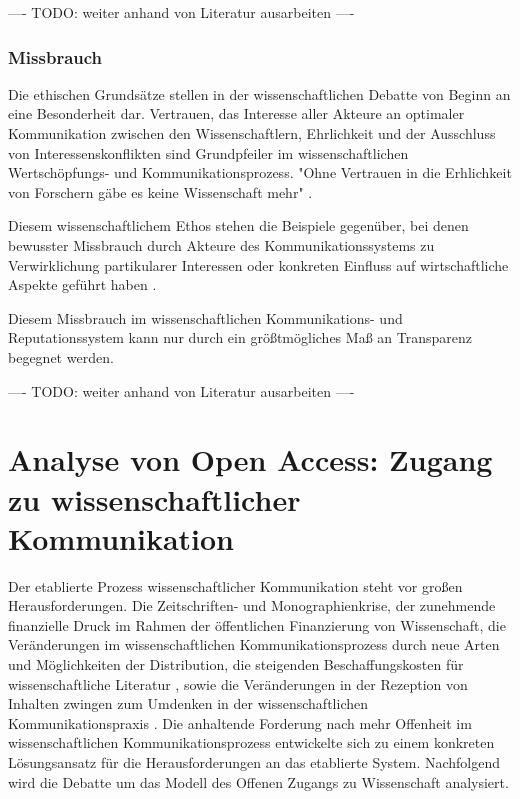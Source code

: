 ---- TODO: weiter anhand von Literatur ausarbeiten ----

\subsubsection{Missbrauch}

Die ethischen Grundsätze stellen in der wissenschaftlichen Debatte von Beginn an eine Besonderheit dar. Vertrauen, das Interesse aller Akteure an optimaler Kommunikation zwischen den Wissenschaftlern, Ehrlichkeit und der Ausschluss von Interessenskonflikten sind Grundpfeiler im wissenschaftlichen Wertschöpfungs- und Kommunikationsprozess. "Ohne Vertrauen in die Erhlichkeit von Forschern gäbe es keine Wissenschaft mehr" \cite{hagner_2015_sache_buches}.

Diesem wissenschaftlichem Ethos stehen die Beispiele gegenüber, bei denen bewusster Missbrauch durch Akteure des Kommunikationssystems zu Verwirklichung partikularer Interessen oder konkreten Einfluss auf wirtschaftliche Aspekte geführt haben \cite{suchen}.

Diesem Missbrauch im wissenschaftlichen Kommunikations- und Reputationssystem kann nur durch ein größtmögliches Maß an Transparenz begegnet werden.

---- TODO: weiter anhand von Literatur ausarbeiten ----

\section{Analyse von Open Access: Zugang zu wissenschaftlicher Kommunikation}

Der etablierte Prozess wissenschaftlicher Kommunikation steht vor großen Herausforderungen. Die Zeitschriften- und Monographienkrise, der zunehmende finanzielle Druck im Rahmen der öffentlichen Finanzierung von Wissenschaft, die Veränderungen im wissenschaftlichen Kommunikationsprozess durch neue Arten und Möglichkeiten der Distribution, die steigenden Beschaffungskosten für wissenschaftliche Literatur \cite{cite:17} \cite{muller_2010_open}, sowie die Veränderungen in der Rezeption von Inhalten \cite{holub_2013_reception} zwingen zum Umdenken in der wissenschaftlichen Kommunikationspraxis \cite{suchen}. Die anhaltende Forderung nach mehr Offenheit im wissenschaftlichen Kommunikationsprozess entwickelte sich zu einem konkreten Lösungsansatz für die Herausforderungen an das etablierte System. Nachfolgend wird die Debatte um das Modell des Offenen Zugangs zu Wissenschaft analysiert.

